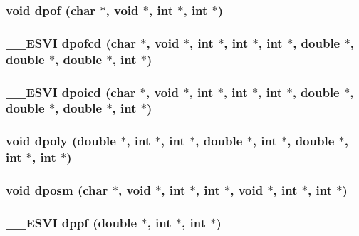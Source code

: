 \subsubsection{\setlength{\rightskip}{0pt plus 5cm}void dpof (char $\ast$, void $\ast$, int $\ast$, int $\ast$)}\label{essl_8h_1b5146d9ec44593c91b97d367f611aa4}


\subsubsection{\setlength{\rightskip}{0pt plus 5cm}\_\-\_\-ESVI dpofcd (char $\ast$, void $\ast$, int $\ast$, int $\ast$, int $\ast$, double $\ast$, double $\ast$, double $\ast$, int $\ast$)}\label{essl_8h_9af95eaad597fef7e1d5a7bd0ab4593a}


\subsubsection{\setlength{\rightskip}{0pt plus 5cm}\_\-\_\-ESVI dpoicd (char $\ast$, void $\ast$, int $\ast$, int $\ast$, int $\ast$, double $\ast$, double $\ast$, double $\ast$, int $\ast$)}\label{essl_8h_dc09bcffebbd3f9d54a3e7a3c1d1be46}


\subsubsection{\setlength{\rightskip}{0pt plus 5cm}void dpoly (double $\ast$, int $\ast$, int $\ast$, double $\ast$, int $\ast$, double $\ast$, int $\ast$, int $\ast$)}\label{essl_8h_5fc3c3b1045ec37743898e6bb9a65d6a}


\subsubsection{\setlength{\rightskip}{0pt plus 5cm}void dposm (char $\ast$, void $\ast$, int $\ast$, int $\ast$, void $\ast$, int $\ast$, int $\ast$)}\label{essl_8h_d227ed04667a61bf2e210dba1f9fbda3}


\subsubsection{\setlength{\rightskip}{0pt plus 5cm}\_\-\_\-ESVI dppf (double $\ast$, int $\ast$, int $\ast$)}\label{essl_8h_ef1bbf783b9295c7ebe903e418361a2b}


